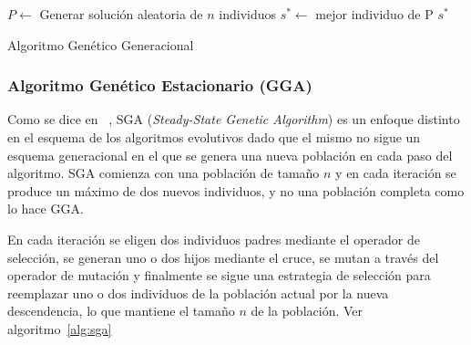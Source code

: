 \documentclass{ci5652}
\begin{document}
\begin{algorithm}[!h]
    \DontPrintSemicolon
    \vspace*{0.1cm}

	$P \leftarrow $ Generar solución aleatoria de $n$ individuos\;
	$s^{*} \leftarrow $ mejor individuo de P\;
	\Return $s^{*}$    
    \vspace*{0.1cm}
    \caption{Algoritmo Genético Generacional}
    \label{alg:gga}
\end{algorithm}
  
\subsubsection{Algoritmo Genético Estacionario (GGA)}

Como se dice en ~\cite{whitley1988genitor}, SGA (\textit{Steady-State Genetic Algorithm}) es un enfoque distinto en el esquema de los algoritmos evolutivos dado que el mismo no sigue un esquema generacional en el que se genera una nueva población en cada paso del algoritmo. SGA comienza con una población de tamaño $n$ y en cada iteración se produce un máximo de dos nuevos individuos, y no una población completa como lo hace GGA.

En cada iteración se eligen dos individuos padres mediante el operador de selección, se generan uno o dos hijos mediante el cruce, se mutan a través del operador de mutación y finalmente se sigue una estrategia de selección para reemplazar uno o dos individuos de la población actual por la nueva descendencia, lo que mantiene el tamaño $n$ de la población. Ver algoritmo~\ref{alg:sga}
\end{document}
